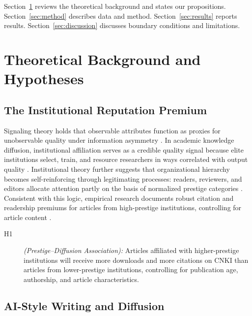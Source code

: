 \documentclass[12pt,a4paper]{article}
\begin{document}
Section~\ref{sec:theory} reviews the theoretical background and states
our propositions.
Section~\ref{sec:method} describes data and method.
Section~\ref{sec:results} reports results.
Section~\ref{sec:discussion} discusses boundary conditions and limitations.

\section{Theoretical Background and Hypotheses}
\label{sec:theory}

\subsection{The Institutional Reputation Premium}

Signaling theory holds that observable attributes function as proxies
for unobservable quality under information asymmetry \citep{Spence1973}.
In academic knowledge diffusion, institutional affiliation serves as a
credible quality signal because elite institutions select, train, and
resource researchers in ways correlated with output quality
\citep{Long1979,Lariviere2010}.
Institutional theory further suggests that organizational hierarchy
becomes self-reinforcing through legitimating processes: readers,
reviewers, and editors allocate attention partly on the basis of
normalized prestige categories \citep{DiMaggio1983}.
Consistent with this logic, empirical research documents robust
citation and readership premiums for articles from high-prestige
institutions, controlling for article content \citep{Wang2013,Lariviere2010}.
\begin{description}
  \item[H1] \textit{(Prestige--Diffusion Association):}
  Articles affiliated with higher-prestige institutions will receive
  more downloads and more citations on CNKI than articles from
  lower-prestige institutions, controlling for publication age,
  authorship, and article characteristics.
\end{description}

\subsection{AI-Style Writing and Diffusion}
\end{document}
